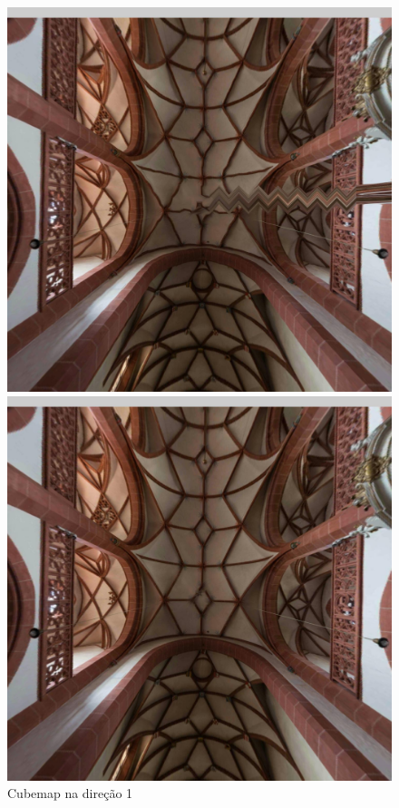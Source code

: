\documentclass[conference]{IEEEtran}
\begin{document}
\begin{figure}[!tbp]
  \centering
  \begin{minipage}[b]{0.3\textwidth}
    \includegraphics[width=1.1\textwidth]{../images/screenshots/Screenshot_2_Equi2Cube}
    \caption{Cubemap na direção 1}
    \label{fig:sphere_direction_0}
  \end{minipage}
  \hfill
  \begin{minipage}[b]{0.3\textwidth}
    \centering
    \includegraphics[width=1.1\textwidth]{../images/screenshots/Screenshot_2_Skybox}

\end{minipage}
\end{figure}
\end{document}
